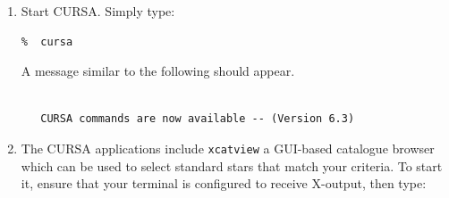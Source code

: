 \documentclass[twoside,11pt]{article}
\begin{document}
\begin{enumerate}
\begin{enumerate}
    \item File {\tt photostandards.tar.Z} is a compressed tar archive.
     It must be decompressed before it can be used.  Type:

\begin{verbatim}
%  uncompress  photostandards.tar.Z
\end{verbatim}

    \item To extract all the files in the archive type:

\begin{verbatim}
%  tar  xvf  photostandards.tar
\end{verbatim}

     Subdirectory {\tt photostandards} should be created in your current
     directory.  File {\tt photostandards/0CATALOGUES.LIS} gives details
     of the catalogues available.  The Landolt (1992) catalogue is file:

    \begin{quote}
     {\tt photostandards/ii183/ii183.TXT}
    \end{quote}

     The name of the subdirectory refers to the numbering of the
     catalogue by the CDS.  The catalogue is in the CURSA Small Text List
     (STL) format for which the file type is {\tt .TXT} (or {\tt .txt}).

    \item Finally, move a copy of the catalogue to a convenient directory
     and make this directory your current directory.

  \end{enumerate}

  \item Start CURSA.  Simply type:

\begin{verbatim}
%  cursa
\end{verbatim}

   A message similar to the following should appear.

\begin{verbatim}

   CURSA commands are now available -- (Version 6.3)

\end{verbatim}

  \item The CURSA applications include {\tt xcatview} a GUI-based
   catalogue browser which can be used to select standard stars that
   match your criteria.  To start it, ensure that your terminal is
   configured to receive X-output, then type:


\end{enumerate}
\end{document}
